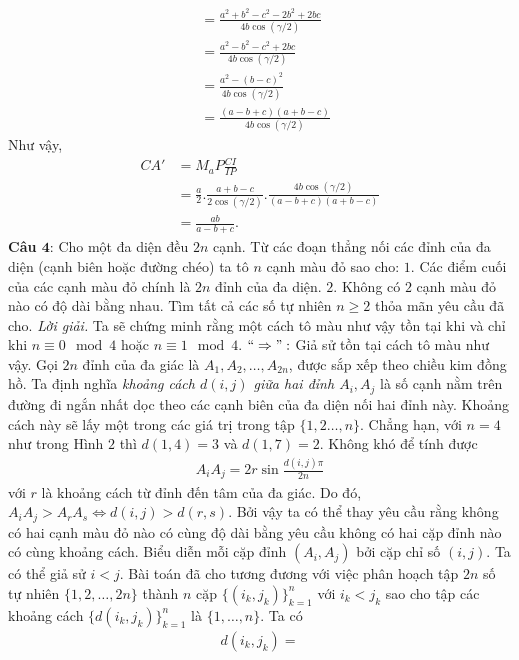 \begin{multicols}{2}
\begin{align*}
			& = \frac{a^2 + b^2 - c^2 - 2b^2 + 2bc}{4b \cos (\gamma / 2)} \\
			& = \frac{a^2 - b^2 - c^2 + 2bc}{4b \cos (\gamma / 2)} \\
			& = \frac{{a^2 -(b-c)^2}}{4b \cos (\gamma / 2)} \\
			& = \frac{(a -b+c)(a+b-c)}{4b \cos (\gamma / 2)}
		\end{align*}
		Như vậy,
		\begin{align*}
			CA' & = M_aP \frac{CI}{IP}  \\
			& = \frac{a}{2} . \frac{a+b-c}{2 \cos(\gamma/2)} . \frac{4b \cos (\gamma/2)}{(a -b+c)(a+b-c)} \\
			& = \frac{ab}{a-b+c}.
		\end{align*}
	\textbf{Câu $\pmb{4}$}: Cho một đa diện đều $2n$ cạnh. Từ các đoạn thẳng nối các đỉnh của đa diện (cạnh biên hoặc đường chéo) ta tô $n$ cạnh màu đỏ sao cho:
	\vskip 0.1cm
	$1.$ Các điểm cuối của các cạnh màu đỏ chính là $2n$ đỉnh của đa diện.
	\vskip 0.1cm
	$2.$ Không có $2$ cạnh màu đỏ nào có độ dài bằng nhau.
	\vskip 0.1cm
	Tìm tất cả các số tự nhiên $n \ge 2$ thỏa mãn yêu cầu đã cho.
	\vskip 0.1cm	
	\textit{Lời giải.}
	Ta sẽ chứng minh rằng một cách tô màu như vậy tồn tại khi và chỉ khi $n \equiv 0 \mod 4$ hoặc $n \equiv 1 \mod 4$.
	\vskip 0.1cm
	$``\Rightarrow":$ Giả sử tồn tại cách tô màu như vậy. Gọi $2n$ đỉnh của đa giác là $A_1, A_2, \ldots, A_{2n}$, được sắp xếp theo chiều kim đồng hồ. Ta định nghĩa \textit{khoảng cách $d(i,j)$ giữa hai đỉnh $A_i, A_j$} là số cạnh nằm trên đường đi ngắn nhất dọc theo các cạnh biên của đa diện nối hai đỉnh này. Khoảng cách này sẽ lấy một trong các giá trị trong tập $\{1,2\ldots,n\}$. Chẳng hạn, với $n=4$ như trong Hình $2$ thì $d(1,4) = 3$ và $d(1,7) = 2$. 
	\vskip 0.1cm
	Không khó để tính được
	\begin{align*}
		A_iA_j = 2r \sin\frac{d(i,j)\pi}{2n}
	\end{align*}
	với $r$ là khoảng cách từ đỉnh đến tâm của đa giác. Do đó, $A_iA_j > A_rA_s \iff d(i,j) > d(r,s)$. Bởi vậy ta có thể thay yêu cầu rằng không có hai cạnh màu đỏ nào có cùng độ dài bằng yêu cầu không có hai cặp đỉnh nào có cùng khoảng cách.
	\vskip 0.1cm	
	Biểu diễn mỗi cặp đỉnh $(A_i, A_j)$ bởi cặp chỉ số $(i,j)$. Ta có thể giả sử $i <j$. Bài toán đã cho tương đương với việc phân hoạch tập $2n$ số tự nhiên $\{1,2,\ldots, 2n\}$ thành $n$ cặp $\{(i_k,j_k)\}_{k = 1}^n$ với $i_k<j_k$ sao cho tập các khoảng cách $\{d(i_k,j_k)\}_{k=1}^n$ là $\{1, \ldots, n\}$. Ta có
	\begin{align*}
		d(i_k,j_k) = 

\end{align*}
\end{multicols}
